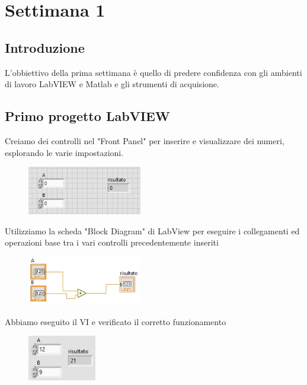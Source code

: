 \chapter{Settimana 1}

\section{Introduzione}

L'obbiettivo della prima settimana è quello di predere confidenza con gli ambienti di lavoro LabVIEW e Matlab e gli strumenti di acquisione.

\vspace{1cm}


\section{Primo progetto LabVIEW}

Creiamo dei controlli nel "Front Panel" per inserire e visualizzare dei numeri, esplorando le varie impostazioni.
\begin{figure}[H]
\caption{}
    \includegraphics[width=5cm]{settimana_1/immagini/primo_vi.jpg}
    \centering
\end{figure}

Utilizziamo la scheda "Block Diagram" di LabView per eseguire i collegamenti ed operazioni base tra i vari controlli precedentemente inseriti
\begin{figure}[H]
\caption{}
    \includegraphics[width=5cm]{settimana_1/immagini/primo_bd.jpg}
    \centering
\end{figure}

Abbiamo eseguito il VI e verificato il corretto funzionamento
\begin{figure}[H]
\caption{}
    \includegraphics[width=3cm]{settimana_1/immagini/prima_esec.jpg}
    \centering
\end{figure}

